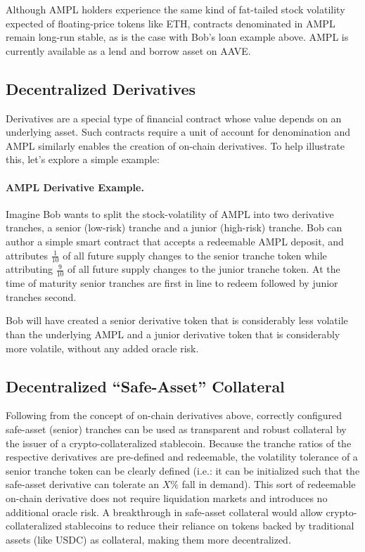 \documentclass[11pt]{article}
\begin{document}
Although AMPL holders experience the same kind of fat-tailed stock volatility expected of
floating-price tokens like ETH, contracts denominated in AMPL remain long-run stable, as is
the case with Bob's loan example above. AMPL is currently available as a lend and borrow
asset on AAVE.

\subsection{Decentralized Derivatives}

Derivatives are a special type of financial contract whose value depends on an underlying
asset. Such contracts require a unit of account for denomination and AMPL similarly enables
the creation of on-chain derivatives. To help illustrate this, let's explore a simple example:

\paragraph{AMPL Derivative Example.}
Imagine Bob wants to split the stock-volatility of AMPL into two derivative tranches, a
senior (low-risk) tranche and a junior (high-risk) tranche. Bob can author a simple smart
contract that accepts a redeemable AMPL deposit, and attributes $\frac{1}{10}$ of all future
supply changes to the senior tranche token while attributing $\frac{9}{10}$ of all future
supply changes to the junior tranche token. At the time of maturity senior tranches are first
in line to redeem followed by junior tranches second.

Bob will have created a senior derivative token that is considerably less volatile than the
underlying AMPL and a junior derivative token that is considerably more volatile, without any
added oracle risk.

\subsection{Decentralized ``Safe-Asset'' Collateral}

Following from the concept of on-chain derivatives above, correctly configured safe-asset
(senior) tranches can be used as transparent and robust collateral by the issuer of a
crypto-collateralized stablecoin. Because the tranche ratios of the respective derivatives
are pre-defined and redeemable, the volatility tolerance of a senior tranche token can be
clearly defined (i.e.: it can be initialized such that the safe-asset derivative can tolerate
an $X\%$ fall in demand). This sort of redeemable on-chain derivative does not require
liquidation markets and introduces no additional oracle risk. A breakthrough in safe-asset
collateral would allow crypto-collateralized stablecoins to reduce their reliance on tokens
backed by traditional assets (like USDC) as collateral, making them more decentralized.
\end{document}
